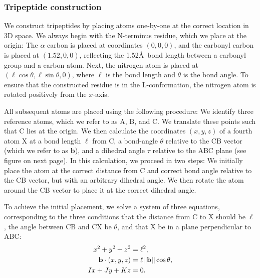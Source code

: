 \documentclass[12pt]{article}
\begin{document}
\subsubsection*{Tripeptide construction}

We construct tripeptides by placing atoms one-by-one at the correct location in 3D space. We always begin with the N-terminus residue, which we place at the origin: The $\alpha$ carbon is placed at coordinates $(0,0,0)$, and the carbonyl carbon is placed at $(1.52, 0, 0)$, reflecting the 1.52\AA\ bond length between a carbonyl group and a carbon atom. Next, the nitrogen atom is placed at $(\ell \cos{\theta}, \ell \sin{\theta}, 0)$, where $\ell$ is the bond length and $\theta$ is the bond angle. To ensure that the constructed residue is in the L-conformation, the nitrogen atom is rotated positively from the $x$-axis. 


All subsequent atoms are placed using the following procedure: We identify three reference atoms, which we refer to as A, B, and C. We translate these points such that C lies at the origin. We then calculate the coordinates $(x, y, z)$ of a fourth atom X at a bond length $\ell$ from C, a bond-angle $\theta$ relative to the CB vector (which we refer to as $\mathbf{b}$), and a dihedral angle $\tau$ relative to the ABC plane (see figure on next page). In this calculation, we proceed in two steps: We initially place the atom at the correct distance from C and correct bond angle relative to the CB vector, but with an arbitrary dihedral angle. We then rotate the atom around the CB vector to place it at the correct dihedral angle.

To achieve the initial placement, we solve a system of three equations, corresponding to the three conditions that the distance from C to X should be $\ell$, the angle between CB and CX be $\theta$, and that X be in a plane perpendicular to ABC:
\begin{align}
x^2 + y^2 + z^2 &= \ell^2, \label{eq:dist}\\
{\bf b} \cdot (x,y,z) &= \ell  ||{\bf b}|| \cos{\theta}, \label{eq:angle}\\
Ix + Jy +Kz &=0. \label{eq:plane}
\end{align}
\end{document}
